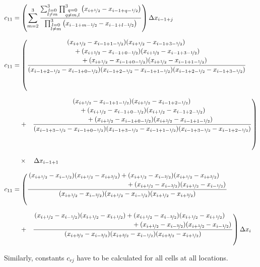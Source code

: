 \documentclass[12pt,a4paper,fleqn]{article}
\begin{document}
\begin{equation*}
\setlength{\jot}{10pt}
\begin{aligned}
c_{11} &= \left(\sum_{m=2}^{3}
\frac{\sum_{\substack{l=0\\l\ne m}}^{3}
    \prod_{\substack{q=0\\q\ne m,l}}^{3}
    \left(x_{i+\nicefrac{1}{2}} - x_{i-1+q-\nicefrac{1}{2}}\right)}
{\prod_{\substack{l=0\\l\ne m}}^{3}
    \left(x_{i-1+m-\nicefrac{1}{2}} - x_{i-1+l-\nicefrac{1}{2}}\right)}\right)
\Delta x_{i-1+j}\\
c_{11} &= \left(\frac{\splitdfrac
    {\splitdfrac{(x_{i+\nicefrac{1}{2}} - x_{i-1+1-\nicefrac{1}{2}})
        (x_{i+\nicefrac{1}{2}} - x_{i-1+3-\nicefrac{1}{2}})}
        {+ (x_{i+\nicefrac{1}{2}}-x_{i-1+0-\nicefrac{1}{2}})
        (x_{i+\nicefrac{1}{2}} - x_{i-1+3-\nicefrac{1}{2}})}}
    {+ (x_{i+\nicefrac{1}{2}}-x_{i-1+0-\nicefrac{1}{2}})
        (x_{i+\nicefrac{1}{2}}- x_{i-1+1-\nicefrac{1}{2}})}}
{(x_{i-1+2-\nicefrac{1}{2}} - x_{i-1+0-\nicefrac{1}{2}})
(x_{i-1+2-\nicefrac{1}{2}} - x_{i-1+1-\nicefrac{1}{2}})
(x_{i-1+2-\nicefrac{1}{2}} - x_{i-1+3-\nicefrac{1}{2}})}\right.\\
&\quad \left. + \quad \frac{\splitdfrac
    {\splitdfrac{(x_{i+\nicefrac{1}{2}} - x_{i-1+1-\nicefrac{1}{2}})
        (x_{i+\nicefrac{1}{2}} - x_{i-1+2-\nicefrac{1}{2}})}
        {+ (x_{i+\nicefrac{1}{2}}-x_{i-1+0-\nicefrac{1}{2}})
        (x_{i+\nicefrac{1}{2}} - x_{i-1+2-\nicefrac{1}{2}})}}
    {+ (x_{i+\nicefrac{1}{2}}-x_{i-1+0-\nicefrac{1}{2}})
        (x_{i+\nicefrac{1}{2}}- x_{i-1+1-\nicefrac{1}{2}})}}
{(x_{i-1+3-\nicefrac{1}{2}} - x_{i-1+0-\nicefrac{1}{2}})
    (x_{i-1+3-\nicefrac{1}{2}} - x_{i-1+1-\nicefrac{1}{2}})
    (x_{i-1+3-\nicefrac{1}{2}} - x_{i-1+2-\nicefrac{1}{2}})}\right)\\
&\quad \times \quad \Delta x_{i-1+1}\\
c_{11} &= \left(\frac{\splitdfrac
    {(x_{i+\nicefrac{1}{2}} - x_{i-\nicefrac{1}{2}})
        (x_{i+\nicefrac{1}{2}} - x_{i+\nicefrac{3}{2}})
        + (x_{i+\nicefrac{1}{2}}-x_{i-\nicefrac{3}{2}})
        (x_{i+\nicefrac{1}{2}} - x_{i+\nicefrac{3}{2}})}
    {+ (x_{i+\nicefrac{1}{2}}-x_{i-\nicefrac{3}{2}})
        (x_{i+\nicefrac{1}{2}}- x_{i-\nicefrac{1}{2}})}}
{(x_{i+\nicefrac{1}{2}} - x_{i-\nicefrac{3}{2}})
    (x_{i+\nicefrac{1}{2}} - x_{i-\nicefrac{1}{2}})
    (x_{i+\nicefrac{1}{2}} - x_{i+\nicefrac{3}{2}})}\right.\\
&\quad \left. + \quad \frac{\splitdfrac
    {(x_{i+\nicefrac{1}{2}} - x_{i-\nicefrac{1}{2}})
        (x_{i+\nicefrac{1}{2}} - x_{i+\nicefrac{1}{2}})
        + (x_{i+\nicefrac{1}{2}}-x_{i-\nicefrac{3}{2}})
        (x_{i+\nicefrac{1}{2}} - x_{i+\nicefrac{1}{2}})}
    {+ (x_{i+\nicefrac{1}{2}}-x_{i-\nicefrac{3}{2}})
        (x_{i+\nicefrac{1}{2}}- x_{i-\nicefrac{1}{2}})}}
{(x_{i+\nicefrac{3}{2}} - x_{i-\nicefrac{3}{2}})
    (x_{i+\nicefrac{3}{2}} - x_{i-\nicefrac{1}{2}})
    (x_{i+\nicefrac{3}{2}} - x_{i+\nicefrac{1}{2}})}\right)
\Delta x_{i}
\end{aligned}
\end{equation*}

Similarly, constants \(c_{rj}\) have to be calculated for all cells at all locations.

\newpage


\end{document}
